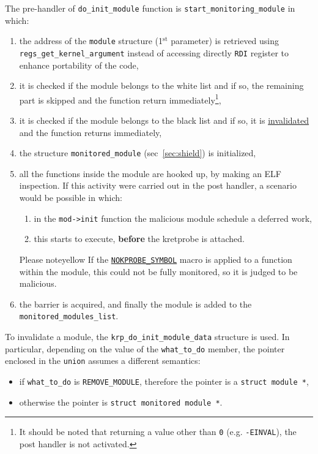 \documentclass{article}
\begin{document}
	The pre-handler of \texttt{do\_init\_module} function is \texttt{start\_monitoring\_module} in which:
	\begin{enumerate}
		\item the address of the \texttt{module} structure (1$^{\text{st}}$ parameter) is retrieved using \texttt{regs\_get\_kernel\_argument} instead of accessing directly \texttt{RDI} register to enhance
		portability of the code,
		\item it is checked if the module belongs to the white list and if so, the remaining part is skipped
		and the function return immediately\footnote{It should be noted that returning a value other than \texttt{0}
		(e.g. \texttt{-EINVAL}), the post handler is not activated.},
		\item it is checked if the module belongs to the black list and if so, it is \ul{invalidated} and the function
		returns immediately,
		\item the structure \texttt{monitored\_module} (sec~\ref{sec:shield}) is initialized,
		\item all the functions inside the module are hooked up, by making an ELF inspection. If this activity were carried out in the post handler,
		a scenario would be possible in which:
		\begin{enumerate}
			\item in the \texttt{mod->init} function the malicious module schedule a deferred work,
			\item this starts to execute, \textbf{before} the kretprobe is attached.
		\end{enumerate}

		\begin{custombox}{Please note}{yellow}
			If the
			\href{https://elixir.bootlin.com/linux/v5.17/source/include/asm-generic/kprobes.h#L15}{\texttt{NOKPROBE\_SYMBOL}}
			macro is applied to a function within the module, this could not be fully monitored, so it is judged
			to be malicious.
		\end{custombox}
		\item the barrier is acquired, and finally the module is added to the \texttt{monitored\_modules\_list}.
	\end{enumerate}

	To invalidate a module, the \texttt{krp\_do\_init\_module\_data} structure is used. In particular, depending on the
	value of the \texttt{what\_to\_do} member, the pointer enclosed in the \texttt{union} assumes a different semantics:
	\begin{itemize}
		\item if \texttt{what\_to\_do} is \texttt{REMOVE\_MODULE}, therefore the pointer is a \texttt{struct module *},
		\item otherwise the pointer is \texttt{struct monitored module *}.
	\end{itemize}
\end{document}
